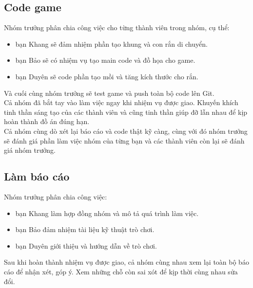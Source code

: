 \documentclass[article]{llncs}
\begin{document}
\subsection{Code game} 
    Nhóm trưởng phân chia công việc cho từng thành viên trong nhóm, cụ thể:\\
    \begin{itemize}
        \item bạn Khang sẽ đảm nhiệm phần tạo khung và con rắn di chuyển.
    \end{itemize}
    \begin{itemize}
        \item bạn Bảo sẽ có nhiệm vụ tạo main code và đồ họa cho game.
    \end{itemize}
    \begin{itemize}
        \item bạn Duyên sẽ code phần tạo mồi và tăng kích thước cho rắn.
    \end{itemize}
    Và cuối cùng nhóm trưởng sẽ test game và push toàn bộ code lên Git.\\
    Cả nhóm đã bắt tay vào làm việc ngay khi nhiệm vụ được giao. Khuyến khích tinh thần sáng tạo của các thành viên và cũng tinh thần giúp đỡ lẫn nhau để kịp hoàn thành đồ án đúng hạn.\\
    Cả nhóm cùng dò xét lại báo cáo và code thật kỹ càng, cùng với đó nhóm trưởng sẽ đánh giá phần làm việc nhóm của từng bạn và các thành viên còn lại sẽ đánh giá nhóm trưởng.
\subsection{Làm báo cáo}
    Nhóm trưởng phân chia công việc:\\
    \begin{itemize}
        \item bạn Khang làm hợp đồng nhóm và mô tả quá trình làm việc.
    \end{itemize}
    \begin{itemize}
        \item bạn Bảo đảm nhiệm tài liệu kỹ thuật trò chơi.
    \end{itemize}
    \begin{itemize}
        \item bạn Duyên giới thiệu và hướng dẫn về trò chơi.
    \end{itemize}
    Sau khi hoàn thành nhiệm vụ được giao, cả nhóm cùng nhau xem lại toàn bộ báo cáo để nhận xét, góp ý. Xem những chỗ còn sai xót để kịp thời cùng nhau sửa đổi.
\end{document}
